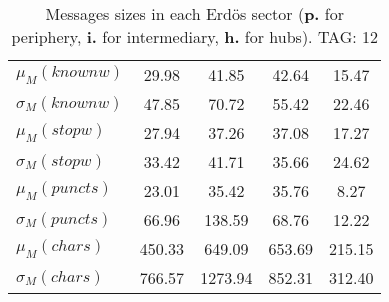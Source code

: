 \begin{table}[h!]
\begin{center}
\begin{tabular}{| l || c | c | c | c |}
$\mu_M(knownw)$ & 29.98  & 41.85  & 42.64  & 15.47 \\
$\sigma_M(knownw)$ & 47.85  & 70.72  & 55.42  & 22.46 \\\hline
$\mu_M(stopw)$ & 27.94  & 37.26  & 37.08  & 17.27 \\
$\sigma_M(stopw)$ & 33.42  & 41.71  & 35.66  & 24.62 \\\hline
$\mu_M(puncts)$ & 23.01  & 35.42  & 35.76  & 8.27 \\
$\sigma_M(puncts)$ & 66.96  & 138.59  & 68.76  & 12.22 \\\hline
$\mu_M(chars)$ & 450.33  & 649.09  & 653.69  & 215.15 \\
$\sigma_M(chars)$ & 766.57  & 1273.94  & 852.31  & 312.40 \\\hline
\end{tabular}
\caption{Messages sizes in each Erd\"os sector ({{\bf p.}} for periphery, {{\bf i.}} for intermediary, {{\bf h.}} for hubs). TAG: 12}
\end{center}
\end{table}